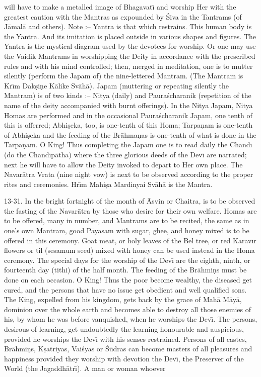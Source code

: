 will have to make a metalled image of Bhagavat\={\i} and worship Her with the greatest caution with the Mantras as expounded by \'Siva in the Tantrams (of J\=amal\=a and others). Note :-- Yantra is that which restrains. This human body is the Yantra. And its imitation is placed outside in various shapes and figures. The Yantra is the mystical diagram used by the devotees for worship. Or one may use the Vaidik Mantrams in worshipping the Deity in accordance with the prescribed rules and with his mind controlled; then, merged in meditation, one is to mutter silently (perform the Japam of) the nine-lettered Mantram. (The Mantram is Kr\={\i}m Dak\d{s}i\d{n}e K\=alike Sv\=ah\=a). Japam (muttering or repeating silently the Mantram) is of two kinds :-- Nitya (daily) and Paura\'scharanik (repetition of the name of the deity accompanied with burnt offerings). In the Nitya Japam, Nitya Homas are performed and in the occasional Paura\'scharanik Japam, one tenth of this is offerred; Abhi\d{s}eka, too, is one-tenth of this Homa; Tarpa\d{n}am is one-tenth of Abhi\d{s}eka and the feeding of the Br\=ahma\d{n}as is one-tenth of what is done in the Tarpa\d{n}am. O King! Thus completing the Japam one is to read daily the Chand\={\i} (do the Chand\={\i}p\=atha) where the three glorious deeds of the Dev\={\i} are narrated; next he will have to allow the Deity invoked to depart to Her own place. The Navar\=atra Vrata (nine night vow) is next to be observed according to the proper rites and ceremonies. Hr\={\i}m Mahi\d{s}a Mardinyai Sv\=ah\=a is the Mantra.

13-31. In the bright fortnight of the month of \=Asvin or Chaitra, is to be observed the fasting of the Navar\=atra by those who desire for their own welfare. Homas are to be offered, many in number, and Mantrams are to be recited, the same as in one's own Mantram, good P\=ayasam with sugar, ghee, and honey mixed is to be offered in this ceremony. Goat meat, or holy leaves of the Bel tree, or red Karav\={\i}r flowers or til (sesamum seed) mixed with honey can be used instead in the Homa ceremony. The special days for the worship of the Dev\={\i} are the eighth, ninth, or fourteenth day (tithi) of the half month. The feeding of the Br\=ahmi\d{n}s must be done on each occasion. O King! Thus the poor become wealthy, the diseased get cured, and the persons that have no issue get obedient and well qualified sons. The King, expelled from his kingdom, gets back by the grace of Mah\=a M\=ay\=a, dominion over the whole earth and becomes able to destroy all those enemies of his, by whom he was before vanquished, when he worships the Dev\={\i}. The persons, desirous of learning, get undoubtedly the learning honourable and auspicious, provided he worships the Dev\={\i} with his senses restrained. Persons of all castes, Br\=ahmi\d{n}s, K\d{s}atriyas, Vai\'syas or \'S\=udras can become masters of all pleasures and happiness provided they worship with devotion the Dev\={\i}, the Preserver of the World (the Jagaddh\=atr\={\i}). A man or woman whoever

